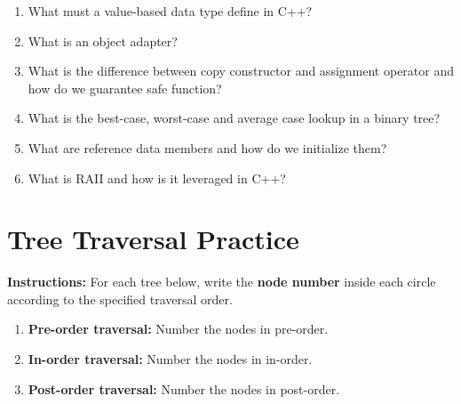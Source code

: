 \documentclass[11pt, letterpaper]{article}
\begin{document}
\begin{enumerate}[leftmargin=*, label=\textbf{\arabic*.}]
  \item What must a value-based data type define in C++?
    \begin{answerspace}
    \end{answerspace}

  \item What is an object adapter?
    \begin{answerspace}
    \end{answerspace}

  \item What is the difference between copy constructor and assignment operator and how do we guarantee safe function?
    \begin{answerspace}
    \end{answerspace}

  \item What is the best-case, worst-case and average case lookup in a binary tree?
    \begin{answerspace}
    \end{answerspace}

  \item What are reference data members and how do we initialize them?
    \begin{answerspace}
    \end{answerspace}

  \item What is RAII and how is it leveraged in C++?
    \begin{answerspace}
    \end{answerspace}

\end{enumerate}
\clearpage
\section*{Tree Traversal Practice}

\noindent\textbf{Instructions:}  
For each tree below, write the \textbf{node number} inside each circle according to the specified traversal order.

\vspace{1em}

\begin{enumerate}[leftmargin=*]
  \item \textbf{Pre-order traversal:} Number the nodes in pre-order.
  \item \textbf{In-order traversal:} Number the nodes in in-order.
  \item \textbf{Post-order traversal:} Number the nodes in post-order.
\end{enumerate}
\end{document}
